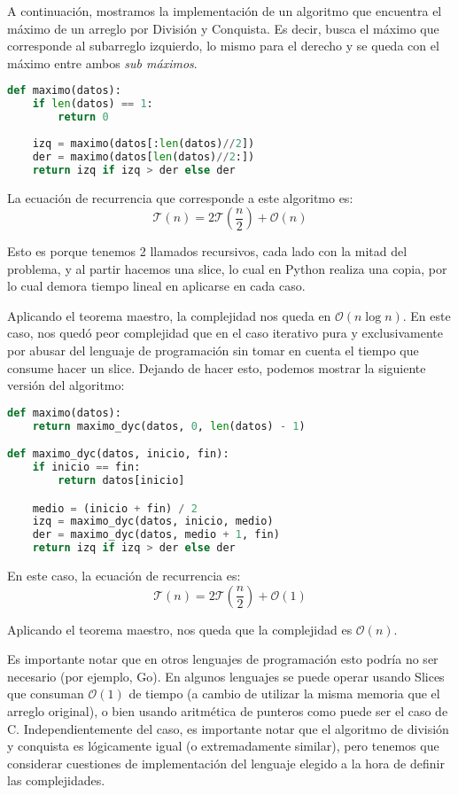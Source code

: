 A continuación, mostramos la implementación de un algoritmo que encuentra el máximo de un arreglo por División y Conquista. Es decir, busca el máximo que corresponde al subarreglo izquierdo, lo mismo para el derecho y se queda con el máximo entre ambos \textit{sub máximos}.

\begin{lstlisting}[language=Python]
def maximo(datos):
    if len(datos) == 1:
        return 0    
    
    izq = maximo(datos[:len(datos)//2])
    der = maximo(datos[len(datos)//2:])
    return izq if izq > der else der
\end{lstlisting}

La ecuación de recurrencia que corresponde a este algoritmo es: 
\begin{equation*} %
    \mathcal{T}(n) = 2 \mathcal{T}\left(\frac{n}{2}\right) + \mathcal{O}(n)
\end{equation*}

Esto es porque tenemos 2 llamados recursivos, cada lado con la mitad del problema, y al partir hacemos una slice, lo cual en Python realiza una copia, por lo cual demora tiempo lineal en aplicarse en cada caso. 

Aplicando el teorema maestro, la complejidad nos queda en $\mathcal{O}\left(n \log n\right)$. En este caso, nos quedó peor complejidad que en el caso iterativo pura y exclusivamente por abusar del lenguaje de programación sin tomar en cuenta el tiempo que consume hacer un slice. Dejando de hacer esto, podemos mostrar la siguiente versión del algoritmo: 

\begin{lstlisting}[language=Python]
def maximo(datos):
    return maximo_dyc(datos, 0, len(datos) - 1)

def maximo_dyc(datos, inicio, fin):
    if inicio == fin:
        return datos[inicio]

    medio = (inicio + fin) / 2
    izq = maximo_dyc(datos, inicio, medio)
    der = maximo_dyc(datos, medio + 1, fin)
    return izq if izq > der else der
\end{lstlisting}

En este caso, la ecuación de recurrencia es: 
\begin{equation*}
    \mathcal{T}(n) = 2 \mathcal{T}\left(\frac{n}{2}\right) + \mathcal{O}(1)
\end{equation*}

Aplicando el teorema maestro, nos queda que la complejidad es $\mathcal{O}\left(n\right)$.

Es importante notar que en otros lenguajes de programación esto podría no ser necesario (por ejemplo, Go). En algunos lenguajes se puede operar usando Slices que consuman $\mathcal{O}(1)$ de tiempo (a cambio de utilizar la misma memoria que el arreglo original), o bien usando aritmética de punteros como puede ser el caso de C. Independientemente del caso, es importante notar que el algoritmo de división y conquista es lógicamente igual (o extremadamente similar), pero tenemos que considerar cuestiones de implementación del lenguaje elegido a la hora de definir las complejidades. 
